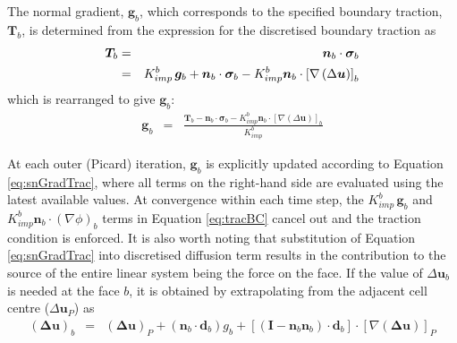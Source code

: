 \documentclass[sn-mathphys,Numbered]{sn-jnl}%
\newcommand{\bb}{\boldsymbol}
\begin{document}
The normal gradient, $\bb{g}_b$, which corresponds to the specified boundary traction, $\bb{T}_b$, is determined from the expression for the discretised boundary traction as
\begin{eqnarray} \label{eq:tracBC}
	\bb{T}_b &=& \bb{n}_b \cdot \boldsymbol{\sigma}_b \notag \\
		&=& K_{imp}^b \, \bb{g}_b + \bb{n}_b \cdot \boldsymbol{\sigma}_b - K_{imp}^b \bb{n}_b \cdot \left[\nabla \left(\Delta\bb{u}\right) \right]_b
\end{eqnarray}
which is rearranged to give $\bb{g}_b$:
\begin{eqnarray} \label{eq:snGradTrac}
	\bb{g}_b &=&
		\frac{\bb{T}_b -  \bb{n}_b \cdot \boldsymbol{\sigma}_b - K_{imp}^b \bb{n}_b \cdot \left[ \nabla \left(\Delta\bb{u}\right) \right]_b}{K_{imp}^b}
\end{eqnarray}

At each outer (Picard) iteration, $\bb{g}_b$ is explicitly updated according to Equation \ref{eq:snGradTrac}, where all terms on the right-hand side are evaluated using the latest available values.
At convergence within each time step, the $K_{imp}^b \, \bb{g}_b$ and $K_{imp}^b \bb{n}_b \cdot (\nabla \phi)_b$ terms in Equation \ref{eq:tracBC} cancel out and the traction condition is enforced.
It is also worth noting that substitution of Equation \ref{eq:snGradTrac} into discretised diffusion term results in the contribution to the source of the entire linear system being the force on the face.
If the value of $\Delta \bb{u}_b$ is needed at the face $b$, it is obtained by extrapolating from the adjacent cell centre ($\Delta \bb{u}_P$) as
\begin{eqnarray}
	\left(\bb{\Delta} \bb{u}\right)_b &=&
		 \left(\bb{\Delta} \bb{u}\right)_P
		 + (\bb{n}_b \cdot \bb{d}_b) g_b
		 + \left[ \left(\textbf{I} - \bb{n}_b \bb{n}_b \right) \cdot \bb{d}_b \right] \cdot \left[\nabla \left(\bb{\Delta} \bb{u}\right)\right]_P
\end{eqnarray}
\end{document}
